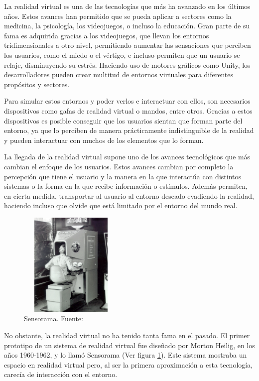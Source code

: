 \documentclass[../main.tex]{subfiles}
\begin{document}

La realidad virtual es una de las tecnologías que más ha avanzado en los últimos años. Estos avances han permitido que se pueda aplicar a sectores como la medicina, la psicología, los videojuegos, o incluso la educación. Gran parte de su fama es adquirida gracias a los videojuegos, que llevan los entornos tridimensionales a otro nivel, permitiendo aumentar las sensaciones que perciben los usuarios, como el miedo o el vértigo, e incluso permiten que un usuario se relaje, disminuyendo su estrés. Haciendo uso de motores gráficos como Unity, los desarrolladores pueden crear multitud de entornos virtuales para diferentes propósitos y sectores.

Para simular estos entornos y poder verlos e interactuar con ellos, son necesarios dispositivos como gafas de realidad virtual o mandos, entre otros. Gracias a estos dispositivos es posible conseguir que los usuarios sientan que forman parte del entorno, ya que lo perciben de manera prácticamente indistinguible de la realidad y pueden interactuar con muchos de los elementos que lo forman.

La llegada de la realidad virtual supone uno de los avances tecnológicos que más cambian el enfoque de los usuarios. Estos avances cambian por completo la percepción que tiene el usuario y la manera en la que interactúa con distintos sistemas o la forma en la que recibe información o estímulos. Además permiten, en cierta medida, transportar al usuario al entorno deseado evadiendo la realidad, haciendo incluso que olvide que está limitado por el entorno del mundo real.

\begin{figure}[htbp]
\centering
\includegraphics[width=5cm, height= 5cm]{imagenes/Sensorama.jpg}
\caption{Sensorama. Fuente:\cite{Sensorama}}
\label{fig:Sensorama}
\end{figure}

No obstante, la realidad virtual no ha tenido tanta fama en el pasado. El primer prototipo de un sistema de realidad virtual fue diseñado por Morton Heilig, en los años 1960-1962, y lo llamó Sensorama (Ver figura \ref{fig:Sensorama}). Este sistema mostraba un espacio en realidad virtual pero, al ser la primera aproximación a esta tecnología, carecía de interacción con el entorno.
\end{document}
